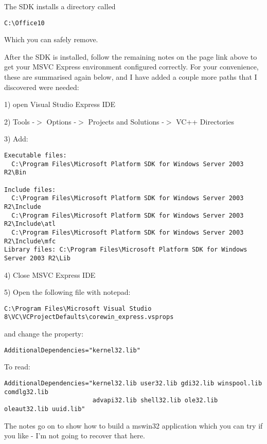 The SDK installs a directory called

\begin{verbatim}
C:\Office10
\end{verbatim}

Which you can safely remove.

After the SDK is installed, follow the remaining notes on the page link 
above to get your MSVC Express environment configured correctly. For your 
convenience, these are summarised again below, and I have added a couple 
more paths that I discovered were needed:

1) open Visual Studio Express IDE

2) Tools -$>$ Options -$>$ Projects and Solutions -$>$ VC++ Directories

3) Add:

\begin{verbatim}
Executable files: 
  C:\Program Files\Microsoft Platform SDK for Windows Server 2003 R2\Bin

Include files: 
  C:\Program Files\Microsoft Platform SDK for Windows Server 2003 R2\Include
  C:\Program Files\Microsoft Platform SDK for Windows Server 2003 R2\Include\atl
  C:\Program Files\Microsoft Platform SDK for Windows Server 2003 R2\Include\mfc
Library files: C:\Program Files\Microsoft Platform SDK for Windows Server 2003 R2\Lib
\end{verbatim}

4) Close MSVC Express IDE

5) Open the following file with notepad:

\begin{verbatim}
C:\Program Files\Microsoft Visual Studio 8\VC\VCProjectDefaults\corewin_express.vsprops
\end{verbatim}

and change the property:

\begin{verbatim}
AdditionalDependencies="kernel32.lib"
\end{verbatim}

To read:

\begin{verbatim}
AdditionalDependencies="kernel32.lib user32.lib gdi32.lib winspool.lib comdlg32.lib 
                        advapi32.lib shell32.lib ole32.lib oleaut32.lib uuid.lib"
\end{verbatim}

The notes go on to show how to build a mswin32 application which you can try if you like - 
I'm not going to recover that here.

